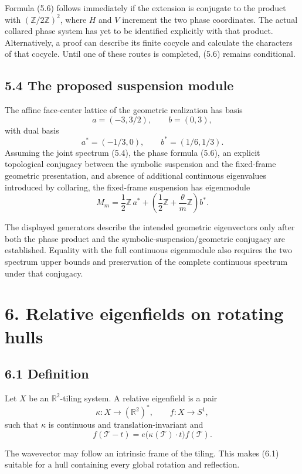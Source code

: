\documentclass[11pt]{article}
\begin{document}
Formula (5.6) follows immediately if the extension is conjugate to the
product with \((\mathbb Z/2\mathbb Z)^2\), where \(H\) and \(V\) increment
the two phase coordinates. The actual collared phase system has yet to be
identified explicitly with that product. Alternatively, a proof can describe
its finite cocycle and calculate the characters of that cocycle. Until one of
these routes is completed, (5.6) remains conditional.

\subsection*{5.4 The proposed suspension module}

The affine face-center lattice of the geometric realization has basis
\[
  a=(-3,3/2),\qquad b=(0,3),
\]
with dual basis
\[
  a^*=(-1/3,0),\qquad b^*=(1/6,1/3).
\]
Assuming the joint spectrum (5.4), the phase formula (5.6), an explicit
topological conjugacy between the symbolic suspension and the fixed-frame
geometric presentation, and absence of additional continuous eigenvalues
introduced by collaring, the fixed-frame suspension has eigenmodule
\[
  M_m=
  \frac12\mathbb Z\,a^*
  +
  \left(
    \frac12\mathbb Z+\frac{\theta}{m}\mathbb Z
  \right)b^*.
  \tag{5.7}
\]

The displayed generators describe the intended geometric eigenvectors only
after both the phase product and the symbolic-suspension/geometric
conjugacy are established. Equality with the full continuous eigenmodule
also requires the two spectrum upper bounds and preservation of the complete
continuous spectrum under that conjugacy.

\section*{6. Relative eigenfields on rotating hulls}

\subsection*{6.1 Definition}

Let \(X\) be an \(\mathbb R^2\)-tiling system. A relative eigenfield is a pair
\[
  \kappa:X\longrightarrow(\mathbb R^2)^*,
  \qquad
  f:X\longrightarrow S^1,
\]
such that \(\kappa\) is continuous and translation-invariant and
\[
  f(\mathcal T-t)
  =
  e\bigl(\kappa(\mathcal T)\mathbin{\cdot}t\bigr)f(\mathcal T).
  \tag{6.1}
\]

The wavevector may follow an intrinsic frame of the tiling. This makes
(6.1) suitable for a hull containing every global rotation and reflection.
\end{document}
